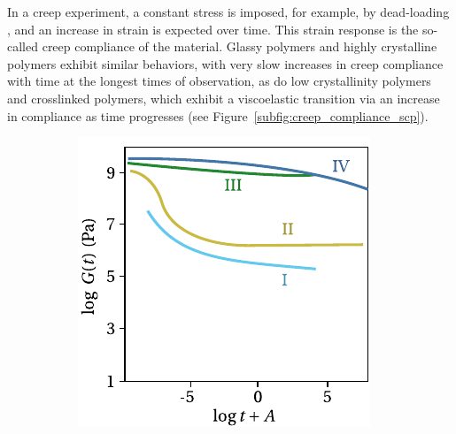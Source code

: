In a creep experiment, a constant stress is imposed, for example, by dead-loading \citep{wildingCreepRecoveryUltra1981}, and an increase in strain is expected over time.
This strain response is the so-called creep compliance of the material.
Glassy polymers and highly crystalline polymers exhibit similar behaviors, with very slow increases in creep compliance with time at the longest times of observation, as do low crystallinity polymers and crosslinked polymers, which exhibit a viscoelastic transition via an increase in compliance as time progresses \citep{ferryViscoelasticPropertiesPolymers1980} (see Figure~\ref{subfig:creep_compliance_scp}).
\begin{figure}[hbtp]
    \centering
    \begin{subfigure}[b]{0.45\textwidth}
                            \centering
                            \includegraphics[width=\textwidth]{figures/relax_modulus_scp}
                            \caption{}
                            \label{subfig:relax_modulus_scp}
            \end{subfigure} \hfill
            \begin{subfigure}[b]{0.45\textwidth}
                            \centering

\end{subfigure}
\end{figure}
